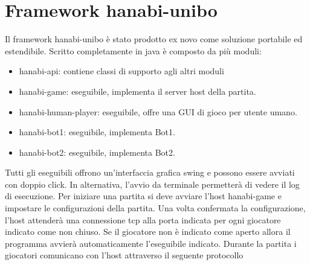\documentclass{article}
\begin{document}
\section{Framework hanabi-unibo}
Il framework hanabi-unibo è stato prodotto ex novo come soluzione portabile ed estendibile. Scritto completamente in java è composto da più moduli:
\begin{itemize}
    \item hanabi-api: contiene classi di supporto agli altri moduli
    \item hanabi-game: eseguibile, implementa il server host della partita. 
    \item hanabi-human-player: eseguibile, offre una GUI di gioco per utente umano.
    \item hanabi-bot1: eseguibile, implementa Bot1.
    \item hanabi-bot2: eseguibile, implementa Bot2.
\end{itemize}
Tutti gli eseguibili offrono un'interfaccia grafica swing e possono essere avviati con doppio click. In alternativa, l'avvio da terminale permetterà di vedere il log di esecuzione.\newline
\newline
Per iniziare una partita si deve avviare l'host hanabi-game e impostare le configurazioni della partita.\newline
Una volta confermata la configurazione, l'host attenderà una connessione tcp alla porta indicata per ogni giocatore indicato come non chiuso. Se il giocatore non è indicato come aperto allora il programma avvierà automaticamente l'eseguibile indicato.\newline
\newline
Durante la partita i giocatori comunicano con l'host attraverso il seguente protocollo
\end{document}
